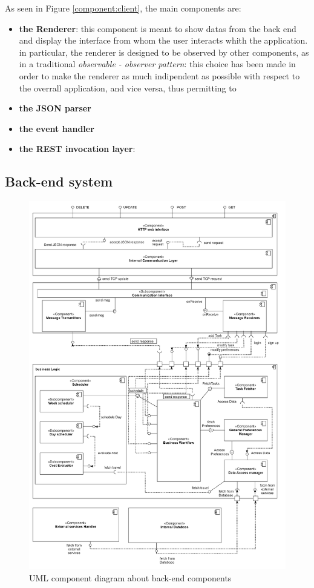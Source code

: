As seen in Figure \ref{component:client}, the main components are:
\begin{itemize}
    \item \textbf{the Renderer}: this component is meant to show datas from the back end and display the interface from whom the user interacts whith the application.
                                 in particular, the renderer is designed to be observed by other components, as in a traditional \emph{observable - observer pattern}:
                                 this choice has been made in order to make the renderer as much indipendent as possible with respect to the overrall application, and
                                 vice versa, thus permitting to  
    \item \textbf{the JSON parser}
    \item \textbf{the event handler}
    \item \textbf{the REST invocation layer}:
\end{itemize}


\subsection{Back-end system}
\newpage
\begin{figure}[H]
    \centering
    \includegraphics[scale=0.2]{Pictures/ComponentDiagram/componentDiagram.png}
    \caption{UML component diagram about back-end components}
\end{figure}


